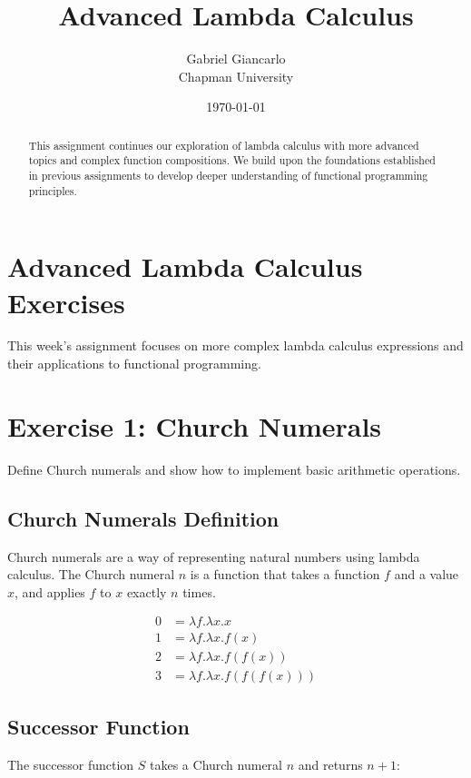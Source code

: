 \documentclass{article}
\title{Advanced Lambda Calculus}
\author{Gabriel Giancarlo \\ Chapman University}
\date{\today}
\theoremstyle{plain}
\theoremstyle{definition}
\theoremstyle{remark}
\begin{document}
\maketitle

\begin{abstract}
This assignment continues our exploration of lambda calculus with more advanced topics and complex function compositions. We build upon the foundations established in previous assignments to develop deeper understanding of functional programming principles.
\end{abstract}

\section{Advanced Lambda Calculus Exercises}

This week's assignment focuses on more complex lambda calculus expressions and their applications to functional programming.

\section{Exercise 1: Church Numerals}

Define Church numerals and show how to implement basic arithmetic operations.

\subsection{Church Numerals Definition}

Church numerals are a way of representing natural numbers using lambda calculus. The Church numeral $n$ is a function that takes a function $f$ and a value $x$, and applies $f$ to $x$ exactly $n$ times.

\begin{align}
0 &= \lambda f.\lambda x.x \\
1 &= \lambda f.\lambda x.f(x) \\
2 &= \lambda f.\lambda x.f(f(x)) \\
3 &= \lambda f.\lambda x.f(f(f(x)))
\end{align}

\subsection{Successor Function}

The successor function $S$ takes a Church numeral $n$ and returns $n+1$:
\end{document}
